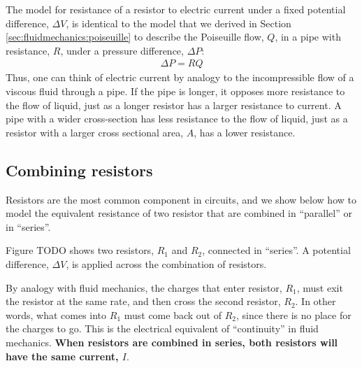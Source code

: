 The model for resistance of a resistor to electric current under a fixed potential difference, $\Delta V$, is identical to the model that we derived in Section \ref{sec:fluidmechanics:poiseuille} to describe the Poiseuille flow, $Q$, in a pipe with resistance, $R$, under a pressure difference, $\Delta P$:
\begin{align*}
\Delta P = RQ
\end{align*} 
Thus, one can think of electric current by analogy to the incompressible flow of a viscous fluid through a pipe. If the pipe is longer, it opposes more resistance to the flow of liquid, just as a longer resistor has a larger resistance to current. A pipe with a wider cross-section has less resistance to the flow of liquid, just as a resistor with a larger cross sectional area, $A$, has a lower resistance.
\subsection{Combining resistors}
Resistors are the most common component in circuits, and we show below how to model the equivalent resistance of two resistor that are combined in ``parallel'' or in ``series''.

Figure TODO shows two resistors, $R_1$ and $R_2$, connected in ``series''. A potential difference, $\Delta V$, is applied across the combination of resistors.

By analogy with fluid mechanics, the charges that enter resistor, $R_1$, must exit the resistor at the same rate, and then cross the second resistor, $R_2$. In other words, what comes into $R_1$ must come back out of $R_2$, since there is no place for the charges to go. This is the electrical equivalent of ``continuity'' in fluid mechanics. \textbf{When resistors are combined in series, both resistors will have the same current, $I$}.

